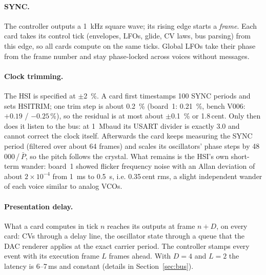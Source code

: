 \documentclass[11pt,a4paper]{article}
\begin{document}
\paragraph{SYNC.} The controller outputs a \SI{1}{kHz} square wave; its rising edge starts a \emph{frame}. Each card
takes its control tick (envelopes, LFOs, glide, CV laws, bus parsing) from this edge, so all cards compute on the same
ticks. Global LFOs take their phase from the frame number and stay phase-locked across voices without messages.

\paragraph{Clock trimming.} The HSI is specified at $\pm$\SI{2}{\percent}. A card first timestamps 100 SYNC periods
and sets HSITRIM; one trim step is about \SI{0.2}{\percent} (board~1: \SI{0.21}{\percent}, bench V006: $+0.19$ /
$-0.25$\,\%), so the residual is at most about $\pm$\SI{0.1}{\percent} or 1.8\,cent. Only then does it listen to the
bus: at \SI{1}{Mbaud} its USART divider is exactly 3.0 and cannot correct the clock itself. Afterwards the card keeps
measuring the SYNC period (filtered over about 64 frames) and scales its oscillators' phase steps by
48\,000\,/\,$\bar P$, so the pitch follows the crystal. What remains is the HSI's own short-term wander: board~1
showed flicker frequency noise with an Allan deviation of about $2\times10^{-4}$ from \SI{1}{ms} to \SI{0.5}{s}, i.e.
0.35\,cent rms, a slight independent wander of each voice similar to analog VCOs.

\paragraph{Presentation delay.} What a card computes in tick $n$ reaches its outputs at frame $n + D$, on every card:
CVs through a delay line, the oscillator state through a queue that the DAC renderer applies at the exact carrier
period. The controller stamps every event with its execution frame $L$ frames ahead. With $D = 4$ and $L = 2$ the
latency is 6--7\,ms and constant (details in Section~\ref{sec:bus}).
\end{document}
